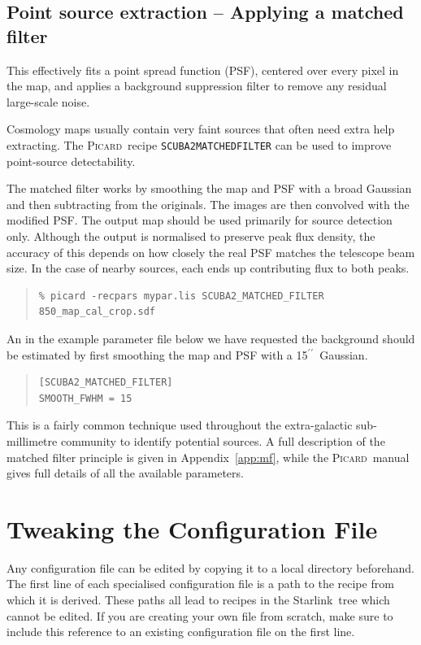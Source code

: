 \documentclass[twoside,11pt]{article}
\newcommand{\htmladdnormallink}[2]{#1}
\newcommand{\xref}[3]{#1}
\newcommand{\xlabel}[1]{}
\renewcommand{\_}{\texttt{\symbol{95}}}
\newcommand{\arcmin}{\mbox{$^\prime$}}
\newcommand{\arcsec}{\arcmin\hspace*{-0.1em}\arcmin}
\newenvironment{myquote}{\begin{quote}\begin{small}}{\end{small}\end{quote}}
\newcommand{\starlink}{\htmladdnormallink{Starlink}{http://starlink.jach.hawaii.edu}}
\newcommand{\picard}{\xref{\textsc{Picard}}{sun265}{}}
\begin{document}
\subsection{\xlabel{match_filter}Point source extraction --  Applying a matched filter}
\label{sec:mf}
This effectively fits a point spread function (PSF), centered over
every pixel in the map, and applies a background suppression filter to
remove any residual large-scale noise.

Cosmology maps usually contain very faint sources that often need
extra help extracting. The \picard\ recipe
\texttt{SCUBA2\_MATCHED\_FILTER} can be used to improve point-source
detectability.

The matched filter works by smoothing the map and PSF with a broad
Gaussian and then subtracting from the originals. The images are then
convolved with the modified PSF.  The output map should be used
primarily for source detection only. Although the output is normalised
to preserve peak flux density, the accuracy of this depends on how
closely the real PSF matches the telescope beam size. In the case of
nearby sources, each ends up contributing flux to both peaks.

 \begin{myquote}
\begin{verbatim}
% picard -recpars mypar.lis SCUBA2_MATCHED_FILTER 850_map_cal_crop.sdf
\end{verbatim}
\end{myquote}

An in the example parameter file below we have requested the
background should be estimated by first smoothing the map and PSF with
a 15\arcsec\ Gaussian.
\begin{myquote}
\begin{verbatim}
[SCUBA2_MATCHED_FILTER]
SMOOTH_FWHM = 15
\end{verbatim}
\end{myquote}
This is a fairly common technique used throughout the extra-galactic
sub-millimetre community to identify potential sources. A full
description of the matched filter principle is given in
Appendix~\ref{app:mf}, while the \picard\ manual gives full details of
all the available parameters.

\clearpage
\section{\xlabel{tweak}Tweaking the Configuration  File}
\label{sec:tweak}

Any configuration file can be edited by copying it to a local
directory beforehand. The first line of each specialised configuration
file is a path to the recipe from which it is derived. These paths all
lead to recipes in the \starlink\ tree which cannot be edited. If you
are creating your own file from scratch, make sure to include this
reference to an existing configuration file on the first line.
\end{document}
